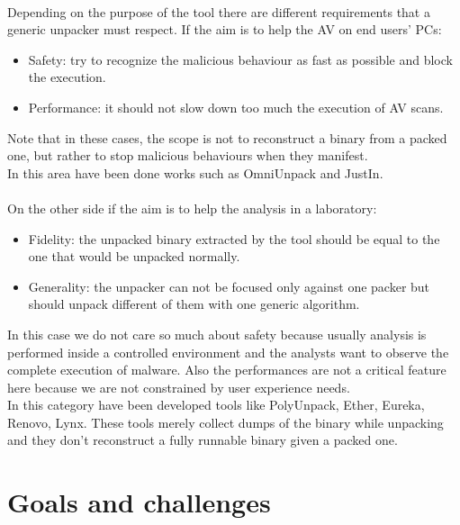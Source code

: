 \begin{itemize}
\paragraph{}
Depending on the purpose of the tool there are different requirements that a generic unpacker must respect. If the aim is to help the AV on end users' PCs:
\begin{itemize}
\item Safety: try to recognize the malicious behaviour as fast as possible and block the execution. 
\item Performance: it should not slow down too much the execution of AV scans.
\end{itemize}
Note that in these cases, the scope is not to reconstruct a binary from a packed one, but rather to stop malicious behaviours when they manifest. \\
In this area have been done works such as OmniUnpack and JustIn.
\paragraph{}
On the other side if the aim is to help the analysis in a laboratory:
\begin{itemize}
\item Fidelity: the unpacked binary extracted by the tool should be equal to the one that would be unpacked normally. 
\item Generality: the unpacker can not be focused only against one packer but should unpack different of them with one generic algorithm.
\end{itemize}
In this case we do not care so much about safety because usually analysis is performed inside a controlled environment and the analysts want to observe the complete execution of malware. Also the performances are not a critical feature here because we are not constrained by user experience needs.\\
In this category have been developed tools like PolyUnpack, Ether, Eureka, Renovo, Lynx.
These tools merely collect dumps of the binary while unpacking and they don't reconstruct a fully runnable binary given a packed one.


\section{Goals and challenges}

\end{itemize}
